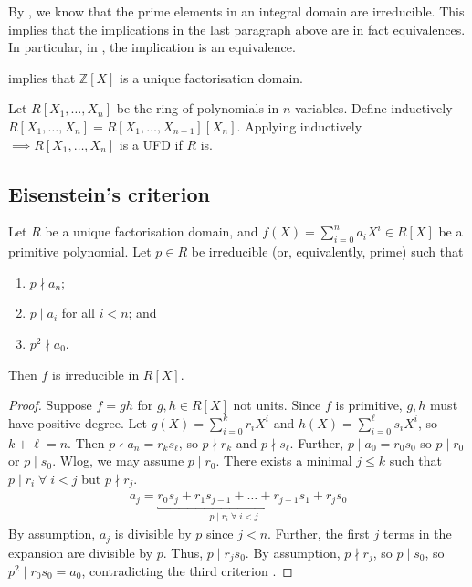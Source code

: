 \begin{remark}
	By , we know that the prime elements in an integral domain are irreducible.
	This implies that the implications in the last paragraph above are in fact equivalences.
	In particular, in , the implication is an equivalence.
\end{remark}

\begin{example}
	 implies that $\mathbb Z[X]$ is a unique factorisation domain.
\end{example}

\begin{example}
	Let $R[X_1, \dots, X_n]$ be the ring of polynomials in $n$ variables.
	Define inductively $R[X_1, \dots, X_n] = R[X_1, \dots, X_{n - 1}][X_n]$.
	Applying  inductively $\implies R[X_1, \dots, X_n]$ is a UFD if $R$ is.
\end{example} 

\subsection{Eisenstein's criterion}
\begin{proposition} \label{prp:eisen}
	Let $R$ be a unique factorisation domain, and $f(X) = \sum_{i=0}^n a_i X^i \in R[X]$ be a primitive polynomial.
	Let $p \in R$ be irreducible (or, equivalently, prime) such that
	\begin{enumerate}
		\item $p \nmid a_n$;
		\item $p \mid a_i$ for all $i < n$; and
		\item $p^2 \nmid a_0$.
	\end{enumerate}
	Then $f$ is irreducible in $R[X]$.
\end{proposition}

\begin{proof}
	Suppose $f = gh$ for $g,h \in R[X]$ not units.
	Since $f$ is primitive, $g, h$ must have positive degree.
	Let $g(X) = \sum_{i=0}^k r_i X^i$ and $h(X) = \sum_{i=0}^\ell s_i X^i$, so $k + \ell = n$.
	Then $p \nmid a_n = r_k s_\ell$, so $p \nmid r_k$ and $p \nmid s_\ell$.
	Further, $p \mid a_0 = r_0 s_0$ so $p \mid r_0$ or $p \mid s_0$.
	Wlog, we may assume $p \mid r_0$.
	There exists a minimal $j \leq k$ such that $p \mid r_i \; \forall \; i < j$ but $p \nmid r_j$.
	\begin{align*}
		a_j = \underbracket{r_0 s_j + r_1 s_{j-1} + \dots + r_{j-1} s_1}_{p \mid r_i \; \forall \; i < j} + r_j s_0
	\end{align*}
	By assumption, $a_j$ is divisible by $p$ since $j < n$.
	Further, the first $j$ terms in the expansion are divisible by $p$.
	Thus, $p \mid r_j s_0$.
	By assumption, $p \nmid r_j$, so $p \mid s_0$, so $p^2 \mid r_0 s_0 = a_0$, contradicting the third criterion \Lightning.
\end{proof}

